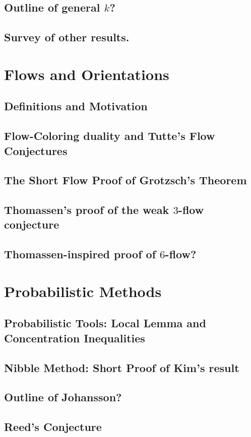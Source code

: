 \documentclass[12pt,twoside,openright,a4paper]{book}
\begin{document}
\section{Outline of general $k$?}
\section{Survey of other results.}

\chapter{Flows and Orientations}
\section{Definitions and Motivation}
\section{Flow-Coloring duality and Tutte's Flow Conjectures}
\section{The Short Flow Proof of Grotzsch's Theorem}
\section{Thomassen's proof of the weak $3$-flow conjecture}
\section{Thomassen-inspired proof of $6$-flow?}

\chapter{Probabilistic Methods}
\section{Probabilistic Tools: Local Lemma and Concentration Inequalities}
\section{Nibble Method: Short Proof of Kim's result}
\section{Outline of Johansson?}
\section{Reed's Conjecture}
\end{document}
